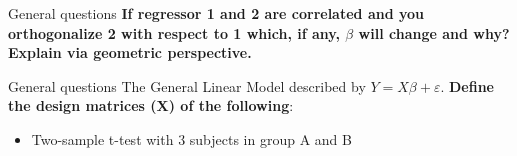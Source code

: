 \documentclass{beamer}
\begin{document}
\begin{frame}{General questions}
  \textbf{If regressor 1 and 2 are correlated and you orthogonalize 2 with respect to 1 which, if any, $\beta$ will change and why? Explain via geometric perspective.}

%
\end{frame}

%
%


\begin{frame}{General questions}
  The General Linear Model described by $Y=X\beta+\varepsilon$. \textbf{Define the design matrices (X) of the following}:

  \begin{itemize}
    \item Two-sample t-test with 3 subjects in group A and B
  \end{itemize}

\end{frame}
\end{document}
